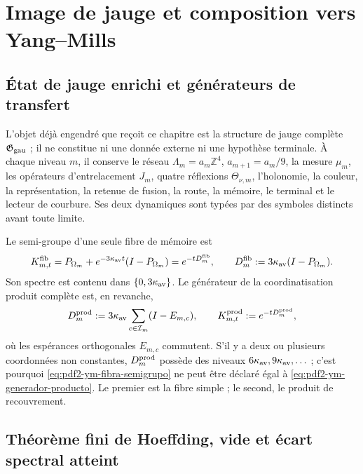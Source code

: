 \section{Image de jauge et composition vers Yang--Mills}

\subsection{État de jauge enrichi et générateurs de transfert}

L’objet déjà engendré que reçoit ce chapitre est la structure de jauge complète
$\mathfrak G_{\rm gau}$ ; il ne constitue ni une donnée externe ni une hypothèse terminale.
À chaque niveau $m$, il conserve le réseau
$\Lambda_m=a_m\mathbb Z^4$, $a_{m+1}=a_m/9$, la mesure $\mu_m$, les
opérateurs d’entrelacement $J_m$, quatre réflexions $\Theta_{\nu,m}$, l’holonomie, la couleur,
la représentation, la retenue de fusion, la route, la mémoire, le terminal et le lecteur de courbure.
Ses deux dynamiques sont typées par des symboles distincts avant toute limite.

Le semi-groupe d’une seule fibre de mémoire est
\begin{equation}\label{eq:pdf2-ym-fibra-semigrupo}
 K^{\rm fib}_{m,t}
 =P_{\Omega_m}+e^{-3\kappa_{\rm av}t}(I-P_{\Omega_m})
 =e^{-tD_m^{\rm fib}},
 \qquad
 D_m^{\rm fib}:=3\kappa_{\rm av}(I-P_{\Omega_m}).
\end{equation}
Son spectre est contenu dans $\{0,3\kappa_{\rm av}\}$. Le générateur de la coordinatisation produit complète est, en revanche,
\begin{equation}\label{eq:pdf2-ym-generador-producto}
 D_m^{\rm prod}:=3\kappa_{\rm av}
 \sum_{c\in\mathcal I_m}(I-E_{m,c}),
 \qquad
 K^{\rm prod}_{m,t}:=e^{-tD_m^{\rm prod}},
\end{equation}
où les espérances orthogonales $E_{m,c}$ commutent. S’il y a deux ou plusieurs
coordonnées non constantes, $D_m^{\rm prod}$ possède des niveaux
$6\kappa_{\rm av},9\kappa_{\rm av},\ldots$ ; c’est pourquoi
\eqref{eq:pdf2-ym-fibra-semigrupo} ne peut être déclaré égal à
\eqref{eq:pdf2-ym-generador-producto}. Le premier est la fibre simple ; le second,
le produit de recouvrement.

\subsection{Théorème fini de Hoeffding, vide et écart spectral atteint}

